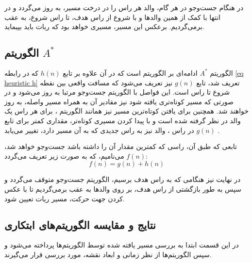 در هنگام جست‌وجو در هر گام، والد هر راس را در درخت مسیر، به روز می‌گردد و در انتها با کمک از همین والد‌ها و با شروع از راس هدف، تا راس شروع، به عقب برمی‌گردیم. برعکس این مسیر، مسیری خواهد بود که ربات باید بپیماید.

\subsection{الگوریتم $A^*$}
الگوریتم $A^*$ ادامه‌ای بر الگوریتم  است که در آن علاوه بر تابع $h(n)$ که در رابطه \ref{eq heuristic h} تعریف شد، تابع $g(n)$ نیز تعریف می‌شود که مسافت واقعی بین نقطه شروع تا راس  است. این فواصل با الگوریتم جست‌وجو مرتبا به روز می‌شود و در صورتی که مسیر کوتاه‌تری یافته شود نیز مقادیر آن به همراه مسیر واصله، به روز خواهند شد. همچنین برای یافتن کوتاه‌ترین مسیر نیز همانند الگوریتم ، برای هر راس یک والد در نظر گرفته شده است و با پیدا کردن مسیری کوتاه‌تر، مقداری کمتر برای تابع $g(n)$ در راس ، والد نیز به راس جدیدی که به آن مسیر دارد، تغییر می‌یابد \cite{russell2002artificial}.

تابعی که طبق آن، راسی که کمترین مقدار آن را داشته باشد جست‌وجو خواهد شد، $f(n)$ می‌نامیم، که به صورت زیر تعریف می‌گردد:
\begin{equation}%
	f(n) = g(n) + h(n)
\end{equation}

در نهایت نیز هنگامی که به راس هدف برسیم، الگوریتم جست‌وجو متوقف می‌گردد و سپس به طور بازگشتی از راس هدف، بر روی والدها به عقب برمی‌گردیم تا با عکس کردن جهت حرکت، مسیر ربات تعیین شود. 


\subsection{نتایج و مقایسه الگوریتم‌های ابتکاری}\label{sec heuristic result}
در این قسمت ابتدا به بررسی مسیر یافته شده توسط الگوریتم‌ها پرداخته می‌شود و سپس الگوریتم‌ها از نظر زمانی و ابعاد نقشه، مورد بررسی قرار می‌گیرند.

